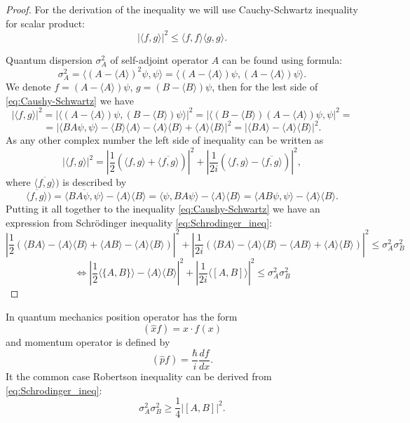 \documentclass[11pt]{article}
\begin{document}
\begin{proof}
For the derivation of the inequality we will use Cauchy-Schwartz inequality for scalar product:
\begin{equation}
|\langle f, g\rangle |^2 \leq \langle f, f\rangle \langle g, g\rangle. \label{eq:Caushy-Schwartz}
\end{equation}

Quantum dispersion $\sigma^2_A$ of self-adjoint operator $A$ can be found using formula:
\[
\sigma_A^2 = \langle (A - \langle A\rangle)^2\psi, \psi\rangle = \langle  (A - \langle A\rangle)\psi,  (A - \langle A\rangle)\psi\rangle.
\]
We denote $f = (A - \langle A\rangle)\psi$, $g = (B - \langle B\rangle)\psi$, then for the lest side of \eqref{eq:Caushy-Schwartz} we have
\[
|\langle f, g\rangle |^2 = |\langle (A - \langle A\rangle)\psi, (B - \langle B\rangle)\psi\rangle |^2 = |\langle (B - \langle B\rangle)(A - \langle A\rangle)\psi, \psi |^2 = 
\]
\[
= | \langle BA\psi, \psi\rangle - \langle B\rangle\langle A\rangle - \langle A\rangle \langle B\rangle + \langle A\rangle\langle B\rangle |^2 = | \langle BA\rangle - \langle A\rangle\langle B\rangle |^2.
\]
As any other complex number the left side of inequality can be written as
\[
|\langle f, g\rangle |^2 = \left| \frac{1}{2}(\langle f, g\rangle + \overline{\langle f, g\rangle})\right|^2 + \left| \frac{1}{2i}(\langle f, g\rangle - \overline{\langle f, g\rangle})\right|^2, 
\]
where $\overline{\langle f, g\rangle})$ is described by
\[
\overline{\langle f, g\rangle}) = \overline{\langle BA\psi, \psi\rangle} - \langle A\rangle\langle B\rangle = \langle\psi, BA\psi\rangle - \langle A\rangle\langle B\rangle = \langle AB\psi, \psi\rangle - \langle A\rangle\langle B\rangle.
\]
Putting it all together to the inequality \eqref{eq:Caushy-Schwartz} we have an expression from Schr\"{o}dinger inequality \eqref{eq:Schrodinger_ineq}:
\[
\left| \frac{1}{2}(\langle BA\rangle - \langle A\rangle\langle B\rangle + \langle AB\rangle - \langle A\rangle\langle B\rangle)\right|^2 + \left| \frac{1}{2i}(\langle BA\rangle - \langle A\rangle\langle B\rangle - \langle AB\rangle + \langle A\rangle\langle B\rangle)\right|^2 \leq \sigma_A^2\sigma_B^2
\]
\[
\Leftrightarrow \left| \frac{1}{2}\langle\{A, B\}\rangle - \langle A\rangle\langle B\rangle \right|^2 + \left| \frac{1}{2i}\langle [A, B]\rangle\right|^2 \leq \sigma_A^2\sigma_B^2
\]
\end{proof}

In quantum mechanics position operator has the form
\[
(\hat{x}f) = x\cdot f(x)
\]
and momentum operator is defined by
\[
(\hat{p}f) = \frac{\hbar}{i}\frac{df}{dx}.
\]
It the common case Robertson inequality can be derived from \eqref{eq:Schrodinger_ineq}:
\[
\sigma_A^2\sigma_B^2 \geq \frac{1}{4}|[A, B]|^2.
\]
\end{document}

